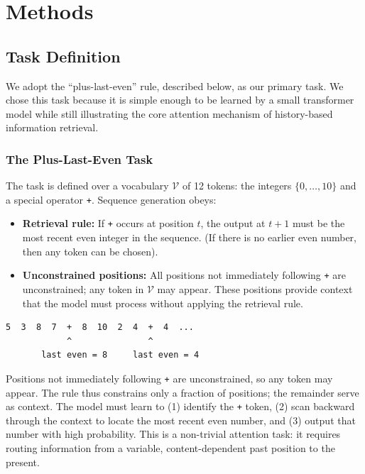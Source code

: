 \documentclass[
  11pt,
  a4paper,
]{article}
\providecommand{\tightlist}{%
  \setlength{\itemsep}{0pt}\setlength{\parskip}{0pt}}
\renewcommand{\tightlist}{}
\begin{document}
\section{Methods}\label{methods}

\subsection{Task Definition}\label{task-definition}

We adopt the ``plus-last-even'' rule, described below, as our primary
task. We chose this task because it is simple enough to be learned by a
small transformer model while still illustrating the core attention
mechanism of history-based information retrieval.

\subsubsection{The Plus-Last-Even Task}\label{the-plus-last-even-task}

The task is defined over a vocabulary \(\mathcal{V}\) of 12 tokens: the
integers \(\{0, \ldots, 10\}\) and a special operator \texttt{+}.
Sequence generation obeys:

\begin{itemize}
\tightlist
\item
  \textbf{Retrieval rule:} If \texttt{+} occurs at position \(t\), the
  output at \(t+1\) must be the most recent even integer in the
  sequence. (If there is no earlier even number, then any token can be
  chosen).
\item
  \textbf{Unconstrained positions:} All positions not immediately
  following \texttt{+} are unconstrained; any token in \(\mathcal{V}\)
  may appear. These positions provide context that the model must
  process without applying the retrieval rule.
\end{itemize}

\begin{verbatim}
5  3  8  7  +  8  10  2  4  +  4  ...
            ^               ^
       last even = 8     last even = 4
\end{verbatim}

Positions not immediately following \texttt{+} are unconstrained, so any
token may appear. The rule thus constrains only a fraction of positions;
the remainder serve as context. The model must learn to (1) identify the
\texttt{+} token, (2) scan backward through the context to locate the
most recent even number, and (3) output that number with high
probability. This is a non-trivial attention task: it requires routing
information from a variable, content-dependent past position to the
present.
\end{document}
